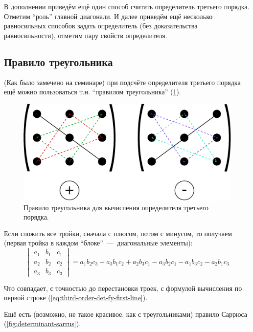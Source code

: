 \documentclass[a4paper,12pt]{article}
\begin{document}
  В дополнении приведём ещё один способ считать определитель третьего порядка.
  Отметим ``роль'' главной диагонали.
  И далее приведём ещё несколько равносильных способов задать определитель (без доказательства равносильности), отметим пару свойств определителя.
  
  
  \subsection{Правило треугольника}
  
  (Как было замечено на семинаре) при подсчёте определителя третьего порядка ещё можно пользоваться т.н. ``правилом треугольника'' (\ref{fig:triangle-rule}).
  
  \begin{figure}[h]
    \centering
    
    \includegraphics[width=0.6\columnwidth]{triangle-rule}
    
    \caption{Правило треугольника для вычисления определителя третьего порядка.}
    \label{fig:triangle-rule}
  \end{figure}
  
  Если сложить все тройки, сначала с плюсом, потом с минусом, то получаем (первая тройка в каждом ``блоке''~---~диагональные элементы):
  \begin{equation*}
    \begin{vmatrix}
      a_1 & b_1 & c_1\\
      a_2 & b_2 & c_2\\
      a_3 & b_3 & c_3
    \end{vmatrix}
      = a_1 b_2 c_3 + a_3 b_1 c_2 + a_2 b_3 c_1 - a_3 b_2 c_1 - a_1 b_3 c_2 - a_2 b_1 c_3
  \end{equation*}
  
  Что совпадает, с точностью до перестановки троек, с формулой вычисления по первой строке (\ref{eq:third-order-det-fy-first-line}).
  
  Ещё есть (возможно, не такое красивое, как с треугольниками) правило Саррюса (\ref{fig:determinant-sarrus}).
  
\end{document}

